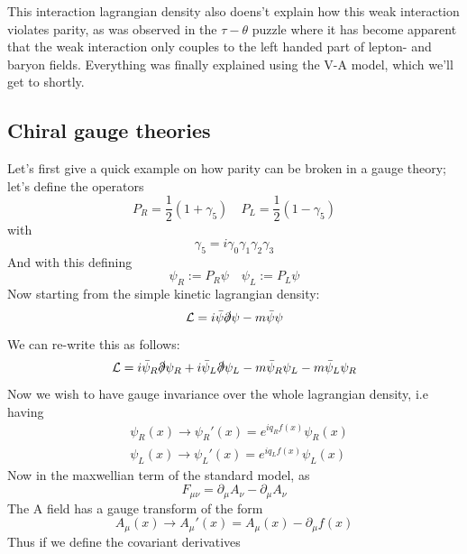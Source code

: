 \documentclass[11pt,a4paper,faculty=we,language=en,doctype=report]{cls/ugent-doc}
\begin{document}
This interaction lagrangian density also doens't explain how this weak interaction violates parity, as was observed in the $\tau-\theta$ puzzle where it has become apparent that the weak interaction only couples
to the left handed part of lepton- and baryon fields. Everything was finally explained using
the V-A model, which we'll get to shortly.

\subsection{Chiral gauge theories}
Let's first give a quick example on how parity can be broken in a gauge theory; let's define the operators
\begin{equation}
	P_R = \frac{1}{2}(1+\gamma_5)\quad P_L = \frac{1}{2}(1-\gamma_5)
\end{equation}
with
\begin{equation}
	\gamma_5 = i\gamma_0\gamma_1\gamma_2\gamma_3
\end{equation}
And with this defining 
\begin{equation}
	\psi_R := P_R\psi \quad \psi_L := P_L\psi
\end{equation}
Now starting from the simple kinetic lagrangian density:
\begin{equation}
  \mathcal{L} = i\bar{\psi}\slashed{\partial}\psi - m\bar{\psi}\psi
\end{equation}
We can re-write this as follows:
\begin{equation}
  \mathcal{L} = i\bar{\psi}_R\slashed{\partial}\psi_R + i\bar{\psi}_L\slashed{\partial}\psi_L - m\bar{\psi}_R\psi_L - m\bar{\psi}_L\psi_R
\end{equation}
Now we wish to have gauge invariance over the whole lagrangian density, 
i.e having
\begin{align}
  &\psi_R(x) \rightarrow \psi_R'(x) = e^{iq_R f(x)}\psi_R(x)\\
  &\psi_L(x) \rightarrow \psi_L'(x) = e^{iq_L f(x)}\psi_L(x)
\end{align}
Now in the maxwellian term of the standard model, as 
\begin{equation}
  F_{\mu\nu} = \partial_\mu A_\nu - \partial_\mu A_\nu
\end{equation}
The A field has a gauge transform of the form
\begin{equation}
	A_\mu(x) \rightarrow A_\mu'(x) = A_\mu(x) - \partial_\mu f(x) \label{eqn:U(1) gauge transform}
\end{equation}
Thus if we define the covariant derivatives
\end{document}
